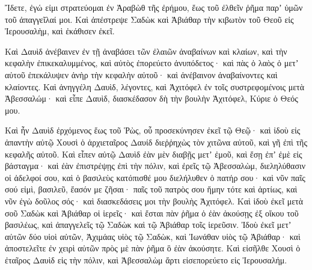 {Ἴδετε, ἐγώ εἰμι στρατεύομαι ἐν Ἀραβὼθ τῆς ἐρήμου, ἕως τοῦ ἐλθεῖν ῥῆμα παρʼ ὑμῶν τοῦ ἀπαγγεῖλαί μοι.
Καὶ ἀπέστρεψε Σαδὼκ καὶ Ἀβιάθαρ τὴν κιβωτὸν τοῦ Θεοῦ εἰς Ἰερουσαλὴμ, καὶ ἐκάθισεν ἐκεῖ.
\par }{\PP {}Καὶ Δαυὶδ ἀνέβαινεν ἐν τῇ ἀναβάσει τῶν ἐλαιῶν ἀναβαίνων καὶ κλαίων, καὶ τὴν κεφαλὴν ἐπικεκαλυμμένος, καὶ αὐτὸς ἐπορεύετο ἀνυπόδετος· καὶ πὰς ὁ λαὸς ὁ μετʼ αὐτοῦ ἐπεκάλυψεν ἀνὴρ τὴν κεφαλὴν αὐτοῦ· καὶ ἀνέβαινον ἀναβαίνοντες καὶ κλαίοντες.
Καὶ ἀνηγγέλη Δαυὶδ, λέγοντες, καὶ Ἀχιτόφελ ἐν τοῖς συστρεφομένοις μετὰ Ἀβεσσαλώμ· καὶ εἶπε Δαυὶδ, διασκέδασον δὴ τὴν βουλὴν Ἀχιτόφελ, Κύριε ὁ Θεός μου.
\par }{\PP {}Καὶ ἦν Δαυὶδ ἐρχόμενος ἕως τοῦ Ῥὼς, οὗ προσεκύνησεν ἐκεῖ τῷ Θεῷ· καὶ ἰδοὺ εἰς ἀπαντὴν αὐτῷ Χουσὶ ὁ ἀρχιεταῖρος Δαυίδ διεῤῥηχὼς τὸν χιτῶνα αὐτοῦ, καὶ γῆ ἐπὶ τῆς κεφαλῆς αὐτοῦ.
Καὶ εἶπεν αὐτῷ Δαυὶδ ἐὰν μὲν διαβῇς μετʼ ἐμοῦ, καὶ ἔσῃ ἐπʼ ἐμὲ εἰς βάσταγμα·
καὶ ἐὰν ἐπιστρέψῃς ἐπὶ τὴν πόλιν, καὶ ἐρεῖς τῷ Ἀβεσσαλὼμ, διεληλύθασιν οἱ ἀδελφοί σου, καὶ ὁ βασιλεὺς κατόπισθέ μου διελήλυθεν ὁ πατήρ σου· καὶ νῦν παῖς σού εἰμὶ, βασιλεῦ, ἔασόν με ζῆσαι· παῖς τοῦ πατρὸς σου ἤμην τότε καὶ ἀρτίως, καὶ νῦν ἐγὼ δοῦλος σός· καὶ διασκεδάσεις μοι τὴν βουλὴς Ἀχιτόφελ.
Καὶ ἰδοὺ ἐκεῖ μετὰ σοῦ Σαδὼκ καὶ Ἀβιάθαρ οἱ ἱερεῖς· καὶ ἔσται πὰν ῥῆμα ὁ ἐὰν ἀκούσῃς ἐξ οἴκου τοῦ βασιλέως, καὶ ἀπαγγελεῖς τῷ Σαδὼκ καὶ τῷ Ἀβιάθαρ τοῖς ἱερεῦσιν.
Ἰδοὺ ἐκεῖ μετʼ αὐτῶν δύο υἱοὶ αὐτῶν, Ἀχιμάας υἱὸς τῷ Σαδὼκ, καὶ Ἰωνάθαν υἱὸς τῷ Ἀβιάθαρ· καὶ ἀποστελεῖτε ἐν χειρὶ αὐτῶν πρὸς μὲ πὰν ῥῆμα ὃ ἐὰν ἀκούσητε.
Καὶ εἰσῆλθε Χουσὶ ὁ ἐταῖρος Δαυὶδ εἰς τὴν πόλιν, καὶ Ἀβεσσαλὼμ ἄρτι εἰσεπορεύετο εἰς Ἰερουσαλήμ.

}
